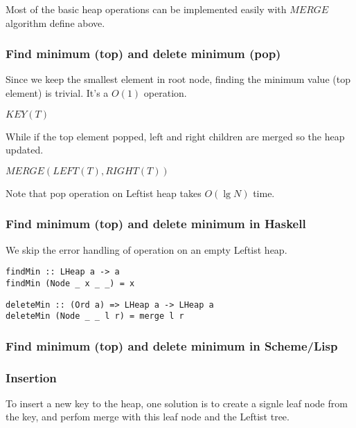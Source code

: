 \documentclass{article}
\begin{document}
Most of the basic heap operations can be implemented easily with $MERGE$
algorithm define above.

\subsubsection{Find minimum (top) and delete minimum (pop)}
Since we keep the smallest element in root node, finding the minimum
value (top element) is trivial. It's a $O(1)$ operation.

\begin{algorithmic}[1]
  \State \Return $KEY(T)$
\EndFunction
\end{algorithmic}

While if the top element popped, left and right children are merged
so the heap updated.

\begin{algorithmic}[1]
  \State \Return $MERGE(LEFT(T), RIGHT(T))$
\EndFunction
\end{algorithmic}

Note that pop operation on Leftist heap takes $O(\lg N)$ time.

\subsubsection*{Find minimum (top) and delete minimum in Haskell}

We skip the error handling of operation on an empty 
Leftist heap.

\lstset{language=Haskell}
\begin{lstlisting}
findMin :: LHeap a -> a
findMin (Node _ x _ _) = x
\end{lstlisting}

\begin{lstlisting}
deleteMin :: (Ord a) => LHeap a -> LHeap a
deleteMin (Node _ _ l r) = merge l r
\end{lstlisting}

\subsubsection*{Find minimum (top) and delete minimum in Scheme/Lisp}

\subsubsection{Insertion}

To insert a new key to the heap, one solution is to create a signle
leaf node from the key, and perfom merge with this leaf node and
the Leftist tree.
\end{document}
